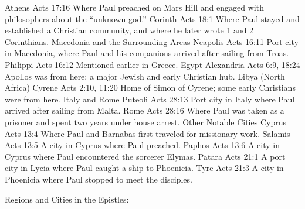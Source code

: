 \textbar{} \textbar{} \textbar{} Athens \textbar{} Acts 17:16 \textbar{} Where Paul preached on Mars Hill and engaged with philosophers about the ``unknown god.'' \textbar{} \textbar{} \textbar{} Corinth \textbar{} Acts 18:1 \textbar{} Where Paul stayed and established a Christian community, and where he later wrote 1 and 2 Corinthians.
\textbar{} \textbar{} Macedonia and the Surrounding Areas \textbar{} Neapolis \textbar{} Acts 16:11 \textbar{} Port city in Macedonia, where Paul and his companions arrived after sailing from Troas.
\textbar{} \textbar{} \textbar{} Philippi \textbar{} Acts 16:12 \textbar{} Mentioned earlier in Greece.
\textbar{} \textbar{} Egypt \textbar{} Alexandria \textbar{} Acts 6:9, 18:24 \textbar{} Apollos was from here; a major Jewish and early Christian hub.
\textbar{} \textbar{} Libya (North Africa) \textbar{} Cyrene \textbar{} Acts 2:10, 11:20 \textbar{} Home of Simon of Cyrene; some early Christians were from here.
\textbar{} \textbar{} Italy and Rome \textbar{} Puteoli \textbar{} Acts 28:13 \textbar{} Port city in Italy where Paul arrived after sailing from Malta.
\textbar{} \textbar{} \textbar{} Rome \textbar{} Acts 28:16 \textbar{} Where Paul was taken as a prisoner and spent two years under house arrest.
\textbar{} \textbar{} Other Notable Cities \textbar{} Cyprus \textbar{} Acts 13:4 \textbar{} Where Paul and Barnabas first traveled for missionary work.
\textbar{} \textbar{} \textbar{} Salamis \textbar{} Acts 13:5 \textbar{} A city in Cyprus where Paul preached.
\textbar{} \textbar{} \textbar{} Paphos \textbar{} Acts 13:6 \textbar{} A city in Cyprus where Paul encountered the sorcerer Elymas.
\textbar{} \textbar{} \textbar{} Patara \textbar{} Acts 21:1 \textbar{} A port city in Lycia where Paul caught a ship to Phoenicia.
\textbar{} \textbar{} \textbar{} Tyre \textbar{} Acts 21:3 \textbar{} A city in Phoenicia where Paul stopped to meet the disciples.
\textbar{}

Regions and Cities in the Epistles:

